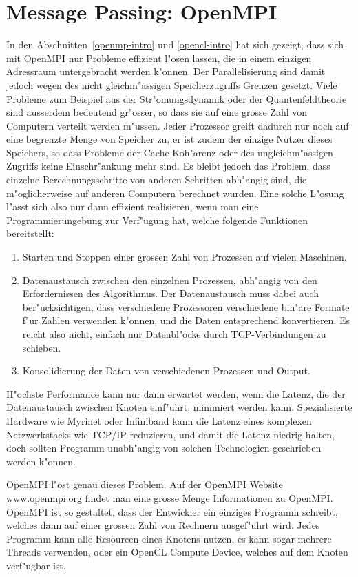 \section{Message Passing: OpenMPI}
In den Abschnitten~\ref{openmp-intro} und \ref{opencl-intro}
hat sich gezeigt, dass sich mit OpenMPI nur Probleme effizient l"osen lassen,
die in einem einzigen Adressraum untergebracht werden k"onnen.
Der Parallelisierung sind damit jedoch wegen des nicht gleichm"assigen
Speicherzugriffs Grenzen gesetzt.
Viele Probleme zum Beispiel aus der Str"omungsdynamik oder
der Quantenfeldtheorie sind ausserdem bedeutend gr"osser, so dass sie
auf eine grosse Zahl von Computern verteilt werden m"ussen.
Jeder Prozessor greift dadurch nur noch auf eine begrenzte Menge von Speicher
zu, er ist zudem der einzige Nutzer dieses Speichers, so dass Probleme
der Cache-Koh"arenz oder des ungleichm"assigen Zugriffs keine
Einschr"ankung mehr sind.
Es bleibt jedoch das Problem, dass einzelne Berechnungsschritte
von anderen Schritten abh"angig sind, die m"oglicherweise auf anderen
Computern berechnet wurden.
Eine solche L"osung l"asst sich also nur dann effizient realisieren,
wenn man eine Programmierungebung zur Verf"ugung hat, welche folgende
Funktionen bereitstellt:
\begin{enumerate}
\item Starten und Stoppen einer grossen Zahl von Prozessen auf vielen
Maschinen.
\item Datenaustausch zwischen den einzelnen Prozessen, abh"angig von den
Erfordernissen des Algorithmus.
Der Datenaustausch muss dabei auch ber"ucksichtigen, dass verschiedene
Prozessoren verschiedene bin"are Formate f"ur Zahlen verwenden
k"onnen, und die Daten entsprechend konvertieren. Es reicht also nicht,
einfach nur Datenbl"ocke durch TCP-Verbindungen zu schieben.
\item Konsolidierung der Daten von verschiedenen Prozessen und Output.
\end{enumerate}

H"ochste Performance kann nur dann erwartet werden, wenn die Latenz, 
die der Datenaustausch zwischen Knoten einf"uhrt, minimiert werden kann.
Spezialisierte Hardware wie Myrinet oder Infiniband kann die Latenz
eines komplexen Netzwerkstacks wie TCP/IP reduzieren, und damit
die Latenz niedrig halten, doch sollten Programm unabh"angig von solchen
Technologien geschrieben werden k"onnen.

OpenMPI l"ost genau dieses Problem.
Auf der OpenMPI Website \url{www.openmpi.org} findet man
eine grosse Menge Informationen zu OpenMPI. 
OpenMPI ist so gestaltet, dass der Entwickler ein einziges Programm
schreibt, welches dann auf einer grossen Zahl von Rechnern
ausgef"uhrt wird. Jedes Programm kann alle Resourcen eines Knotens nutzen,
es kann sogar mehrere Threads verwenden, oder ein OpenCL Compute
Device, welches auf dem Knoten verf"ugbar ist.

